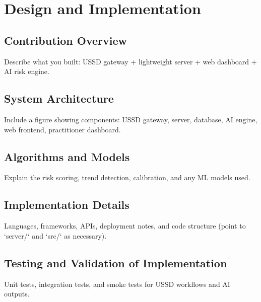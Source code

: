 \chapter{Design and Implementation}
\label{ch:design}

\section{Contribution Overview}
\noindent Describe what you built: USSD gateway + lightweight server + web dashboard + AI risk engine.

\section{System Architecture}
\noindent Include a figure showing components: USSD gateway, server, database, AI engine, web frontend, practitioner dashboard.

\section{Algorithms and Models}
\noindent Explain the risk scoring, trend detection, calibration, and any ML models used.

\section{Implementation Details}
\noindent Languages, frameworks, APIs, deployment notes, and code structure (point to `server/` and `src/` as necessary).

\section{Testing and Validation of Implementation}
\noindent Unit tests, integration tests, and smoke tests for USSD workflows and AI outputs.
